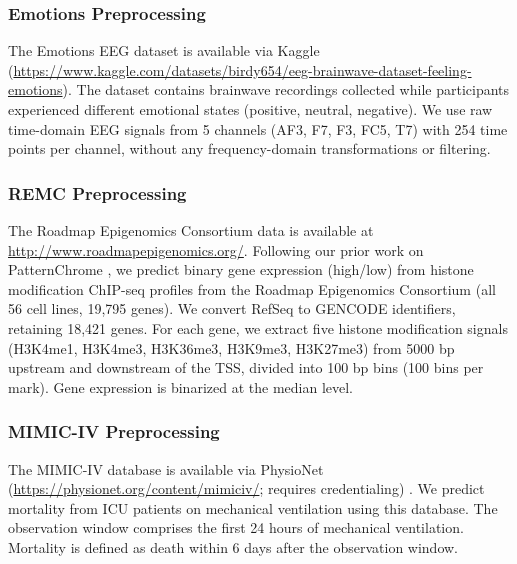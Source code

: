 \documentclass[times, review, 10pt]{elsarticle}
\begin{document}
\subsubsection{Emotions Preprocessing}

The Emotions EEG dataset is available via Kaggle (\url{https://www.kaggle.com/datasets/birdy654/eeg-brainwave-dataset-feeling-emotions}).
The dataset contains brainwave recordings collected while participants experienced different emotional states (positive, neutral, negative).
We use raw time-domain EEG signals from 5 channels (AF3, F7, F3, FC5, T7) with 254 time points per channel, without any frequency-domain transformations or filtering.

\subsubsection{REMC Preprocessing}

The Roadmap Epigenomics Consortium data is available at \url{http://www.roadmapepigenomics.org/}.
Following our prior work on PatternChrome \cite{paul2025prediction}, we predict binary gene
expression (high/low) from histone modification ChIP-seq profiles from the Roadmap Epigenomics Consortium (all 56 cell lines, 19,795 genes).
We convert RefSeq to GENCODE identifiers, retaining 18,421 genes.
For each gene, we extract five histone modification signals (H3K4me1, H3K4me3, H3K36me3, H3K9me3, H3K27me3) from 5000 bp upstream and downstream of the TSS,
divided into 100 bp bins (100 bins per mark). Gene expression is binarized at the median level.

\subsubsection{MIMIC-IV Preprocessing}

The MIMIC-IV database is available via PhysioNet
(\url{https://physionet.org/content/mimiciv/}; requires credentialing)
\cite{Johnson2023MIMICIV}.
We predict mortality from ICU patients on mechanical ventilation using this database.
The observation window comprises the first 24 hours of mechanical ventilation.
Mortality is defined as death within 6 days after the observation window.
\end{document}
